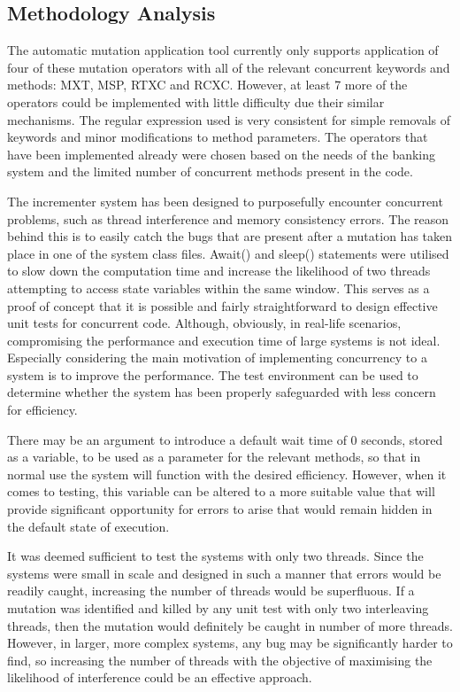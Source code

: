 \documentclass[a4paper,12pt]{article}
\begin{document}
    
    
\subsection{Methodology Analysis}

The automatic mutation application tool currently only supports application of four of these mutation operators with all of the relevant concurrent keywords and methods: MXT, MSP, RTXC and RCXC. However, at least 7 more of the operators could be implemented with little difficulty due their similar mechanisms. The regular expression used is very consistent for simple removals of keywords and minor modifications to method parameters. The operators that have been implemented already were chosen based on the needs of the banking system and the limited number of concurrent methods present in the code.   

The incrementer system has been designed to purposefully encounter concurrent problems, such as thread interference and memory consistency errors. The reason behind this is to easily catch the bugs that are present after a mutation has taken place in one of the system class files. Await() and sleep() statements were utilised to slow down the computation time and increase the likelihood of two threads attempting to access state variables within the same window. This serves as a proof of concept that it is possible and fairly straightforward to design effective unit tests for concurrent code. Although, obviously, in real-life scenarios, compromising the performance and execution time of large systems is not ideal. Especially considering the main motivation of implementing concurrency to a system is to improve the performance. The test environment can be used to determine whether the system has been properly safeguarded with less concern for efficiency.

There may be an argument to introduce a default wait time of 0 seconds, stored as a variable, to be used as a parameter for the relevant methods, so that in normal use the system will function with the desired efficiency. However, when it comes to testing, this variable can be altered to a more suitable value that will provide significant opportunity for errors to arise that would remain hidden in the default state of execution. 

It was deemed sufficient to test the systems with only two threads. Since the systems were small in scale and designed in such a manner that errors would be readily caught, increasing the number of threads would be superfluous. If a mutation was identified and killed by any unit test with only two interleaving threads, then the mutation would definitely be caught in number of more threads. However, in larger, more complex systems, any bug may be significantly harder to find, so increasing the number of threads with the objective of maximising the likelihood of interference could be an effective approach.
\end{document}
